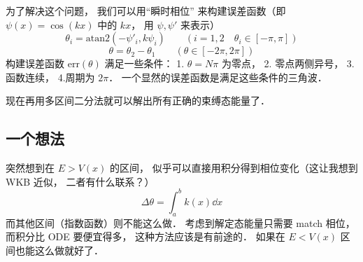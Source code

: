 为了解决这个问题， 我们可以用“瞬时相位” 来构建误差函数（即 $\psi(x) = \cos(kx)$ 中的 $kx$， 用 $\psi, \psi'$ 来表示）
\begin{equation}
\theta_i = \text{atan2}(-\psi'_i, k\psi_i) \qquad (i = 1, 2 \quad \theta_i \in [-\pi, \pi])
\end{equation}
\begin{equation}
\theta = \theta_2 - \theta_1 \qquad (\theta \in [-2\pi, 2\pi])
\end{equation}
构建误差函数 $\text{err}(\theta)$ 满足一些条件： 1. $\theta = N\pi$ 为零点， 2. 零点两侧异号， 3. 函数连续， 4.周期为 $2\pi$． 一个显然的误差函数是满足这些条件的三角波．

现在再用多区间二分法就可以解出所有正确的束缚态能量了．

\subsection{一个想法}
突然想到在 $E > V(x)$ 的区间， 似乎可以直接用积分得到相位变化（这让我想到 WKB 近似， 二者有什么联系？）
\begin{equation}
\Delta \theta = \int_a^b k(x) \dd{x}
\end{equation}
而其他区间（指数函数）则不能这么做． 考虑到解定态能量只需要 match 相位， 而积分比 ODE 要便宜得多， 这种方法应该是有前途的． 如果在 $E < V(x)$ 区间也能这么做就好了．
